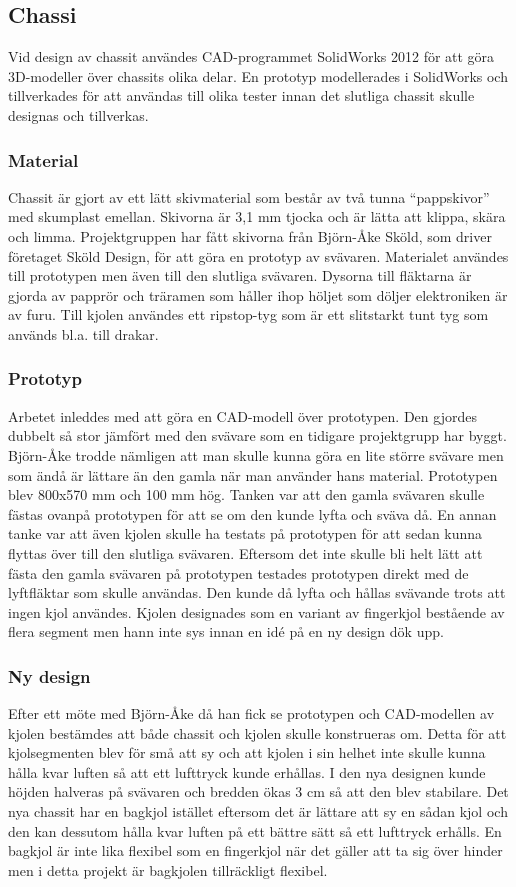\subsection{Chassi}
Vid design av chassit användes CAD-programmet SolidWorks 2012 för att göra
3D-modeller över chassits olika delar. En prototyp modellerades i SolidWorks och
tillverkades för att användas till olika tester innan det slutliga chassit
skulle designas och tillverkas.

\subsubsection{Material}
Chassit är gjort av ett lätt skivmaterial som består av två tunna “pappskivor”
med skumplast emellan. Skivorna är 3,1 mm tjocka och är lätta att klippa, skära
och limma. Projektgruppen har fått skivorna från Björn-Åke Sköld, som driver
företaget Sköld Design, för att göra en prototyp av svävaren. Materialet
användes till prototypen men även till den slutliga svävaren. Dysorna till
fläktarna är gjorda av papprör och träramen som håller ihop höljet som döljer
elektroniken är av furu. Till kjolen användes ett ripstop-tyg som är ett
slitstarkt tunt tyg som används bl.a. till drakar.

\subsubsection{Prototyp}
Arbetet inleddes med att göra en CAD-modell över prototypen. Den gjordes dubbelt
så stor jämfört med den svävare som en tidigare projektgrupp har byggt.
Björn-Åke trodde nämligen att man skulle kunna göra en lite större svävare men
som ändå är lättare än den gamla när man använder hans material. Prototypen blev
800x570 mm och 100 mm hög. Tanken var att den gamla svävaren skulle fästas
ovanpå prototypen för att se om den kunde lyfta och sväva då. En annan tanke var
att även kjolen skulle ha testats på prototypen för att sedan kunna flyttas över
till den slutliga svävaren. Eftersom det inte skulle bli helt lätt att fästa den
gamla svävaren på prototypen testades prototypen direkt med de lyftfläktar som
skulle användas. Den kunde då lyfta och hållas svävande trots att ingen kjol
användes. Kjolen designades som en variant av fingerkjol bestående av flera
segment men hann inte sys innan en idé på en ny design dök upp.

\subsubsection{Ny design}
Efter ett möte med Björn-Åke då han fick se prototypen och CAD-modellen av
kjolen bestämdes att både chassit och kjolen skulle konstrueras om. Detta för
att kjolsegmenten blev för små att sy och att kjolen i sin helhet inte skulle
kunna hålla kvar luften så att ett lufttryck kunde erhållas. I den nya designen
kunde höjden halveras på svävaren och bredden ökas 3 cm så att den blev
stabilare. Det nya chassit har en bagkjol istället eftersom det är lättare att
sy en sådan kjol och den kan dessutom hålla kvar luften på ett bättre sätt så
ett lufttryck erhålls. En bagkjol är inte lika flexibel som en fingerkjol när
det gäller att ta sig över hinder men i detta projekt är bagkjolen tillräckligt
flexibel.

